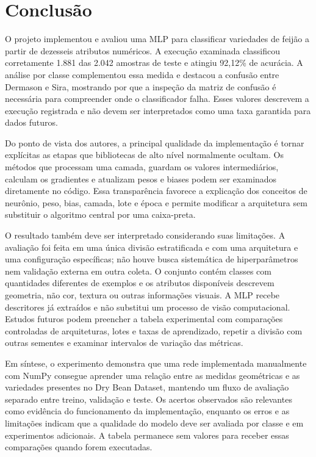 \documentclass[12pt]{article}
\begin{document}
\section{Conclusão}

O projeto implementou e avaliou uma MLP para classificar variedades de feijão a partir de dezesseis atributos numéricos. A execução examinada classificou corretamente 1.881 das 2.042 amostras de teste e atingiu 92,12\% de acurácia. A análise por classe complementou essa medida e destacou a confusão entre Dermason e Sira, mostrando por que a inspeção da matriz de confusão é necessária para compreender onde o classificador falha. Esses valores descrevem a execução registrada e não devem ser interpretados como uma taxa garantida para dados futuros.

Do ponto de vista dos autores, a principal qualidade da implementação é tornar explícitas as etapas que bibliotecas de alto nível normalmente ocultam. Os métodos que processam uma camada, guardam os valores intermediários, calculam os gradientes e atualizam pesos e biases podem ser examinados diretamente no código. Essa transparência favorece a explicação dos conceitos de neurônio, peso, bias, camada, lote e época e permite modificar a arquitetura sem substituir o algoritmo central por uma caixa-preta.

O resultado também deve ser interpretado considerando suas limitações. A avaliação foi feita em uma única divisão estratificada e com uma arquitetura e uma configuração específicas; não houve busca sistemática de hiperparâmetros nem validação externa em outra coleta. O conjunto contém classes com quantidades diferentes de exemplos e os atributos disponíveis descrevem geometria, não cor, textura ou outras informações visuais. A MLP recebe descritores já extraídos e não substitui um processo de visão computacional. Estudos futuros podem preencher a tabela experimental com comparações controladas de arquiteturas, lotes e taxas de aprendizado, repetir a divisão com outras sementes e examinar intervalos de variação das métricas.

Em síntese, o experimento demonstra que uma rede implementada manualmente com NumPy consegue aprender uma relação entre as medidas geométricas e as variedades presentes no Dry Bean Dataset, mantendo um fluxo de avaliação separado entre treino, validação e teste. Os acertos observados são relevantes como evidência do funcionamento da implementação, enquanto os erros e as limitações indicam que a qualidade do modelo deve ser avaliada por classe e em experimentos adicionais. A tabela permanece sem valores para receber essas comparações quando forem executadas.



\end{document}

